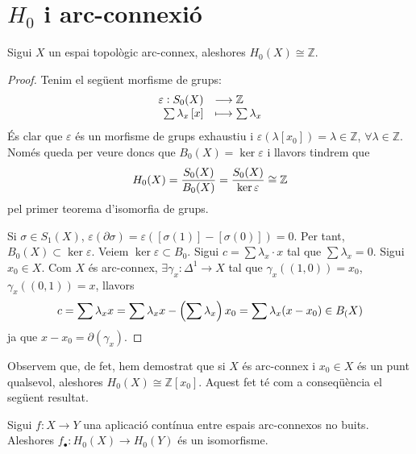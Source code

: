 \documentclass[../main.tex]{subfiles}
\begin{document}
\section{\texorpdfstring{$H_0$}{TEXT} i arc-connexió}

\begin{ter}
Sigui $X$ un espai topològic arc-connex, aleshores $H_0(X)\cong \mathbb{Z}$.
\end{ter}
\begin{proof}
Tenim el següent morfisme de grups:
\begin{equation}
    \notag
    \begin{array}{rl}
        \varepsilon:S_0(X) & \longrightarrow\mathbb{Z} \\
        \sum\lambda_x\left[x\right] & \longmapsto \sum\lambda_x
    \end{array}
\end{equation}
És clar que $\varepsilon$ és un morfisme de grups exhaustiu i $\varepsilon(\lambda[x_0]) = \lambda\in\mathbb{Z}$, $\forall \lambda\in\mathbb{Z}$. Només queda per veure doncs que $B_0(X) = \ker\varepsilon$ i llavors tindrem que
\begin{equation}
    \notag
    H_0(X) = \frac{S_0(X)}{B_0(X)} = \frac{S_0(X)}{\ker\varepsilon} \cong\mathbb{Z}
\end{equation}
pel primer teorema d'isomorfia de grups.

Si $\sigma\in S_1(X)$, $\varepsilon(\partial\sigma) = \varepsilon([\sigma(1)]-[\sigma(0)]) = 0$. Per tant, $B_0(X)\subset\ker\varepsilon$. Veiem $\ker\varepsilon\subset B_0$. Sigui $c = \sum\lambda_x\cdotp x$ tal que $\sum\lambda_x = 0$. Sigui $x_0\in X$. Com $X$ és arc-connex, $\exists\gamma_x:\Delta^1\rightarrow X$ tal que $\gamma_x((1,0)) = x_0$, $\gamma_x((0,1)) = x$, llavors
\begin{equation}
    \notag
    c = \sum\lambda_x x = \sum \lambda_x x-\left(\sum \lambda_x\right) x_0 = \sum\lambda_x(x-x_0)\in B_(X)
\end{equation}
ja que $x-x_0 = \partial(\gamma_x)$.
\end{proof}


Observem que, de fet, hem demostrat que si $X$ és arc-connex i $x_0\in X$ és un punt qualsevol, aleshores $H_0(X)\cong \mathbb{Z}[x_0]$. Aquest fet té com a conseqüència el següent resultat.

\begin{coro}
Sigui $f:X\rightarrow Y$ una aplicació contínua entre espais arc-connexos no buits. Aleshores $f_\bullet:H_0(X)\rightarrow H_0(Y)$ és un isomorfisme.
\end{coro}
\end{document}

